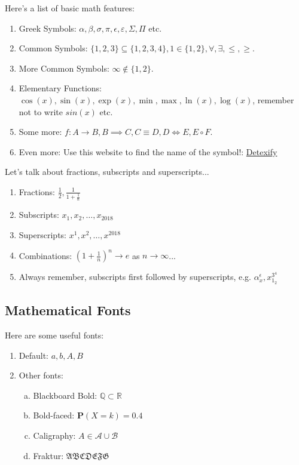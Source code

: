 \documentclass{article} %
\begin{document}
			Here's a list of basic math features:
			\begin{enumerate}
				\item Greek Symbols: $\alpha,\beta,\sigma,\pi,\epsilon,\varepsilon, \Sigma,\Pi$ etc.
				\item Common Symbols: $\{1,2,3\} \subseteq \{1,2,3,4\}, 1 \in \{1,2\},\forall, \exists, \leq, \geq$.
				\item More Common Symbols: $\infty \not \in \{1,2\}$.
				\item Elementary Functions: $\cos(x),\sin(x),\exp(x),\min, \max, \ln(x),\log(x)$, remember not to write $sin(x)$ etc.
				\item Some more: $f:A\to B, B \implies C, C \equiv D, D\Leftrightarrow E, E \circ F$.
				\item Even more: Use this website to find the name of the symbol!: \href{http://detexify.kirelabs.org/classify.html}{Detexify}  %
			\end{enumerate}
			Let's talk about fractions, subscripts and superscripts...
			\begin{enumerate}
				\item Fractions: $\frac{1}{2}, \frac{1}{1+\frac{1}{n}}$
				\item Subscripts: $x_{1},x_{2},\dots,x_{2018}$
				\item Superscripts: $x^{1},x^{2},\dots,x^{2018}$
				\item Combinations: $(1+\frac{1}{n})^{n} \to e$ as $n \to \infty$... 				
				\item Always remember, subscripts first followed by superscripts, e.g. $\alpha_{x}^{\epsilon}, x_{1_{2}}^{3^{4}}$
			\end{enumerate}
		\subsection{Mathematical Fonts}
			Here are some useful fonts:
			\begin{enumerate}
				\item Default: $a,b,A,B$
				\item Other fonts:
				\begin{enumerate}[(a)] %
					\item Blackboard Bold: $\mathbb{Q}\subset\mathbb{R}$
					\item Bold-faced: $\mathbf{P}(X=k)=0.4$
					\item Caligraphy: $A \in \mathcal{A}\cup\mathcal{B}$ 
					\item Fraktur: $\mathfrak{ABCDEFG}$
				\end{enumerate}
			\end{enumerate}
\end{document}
